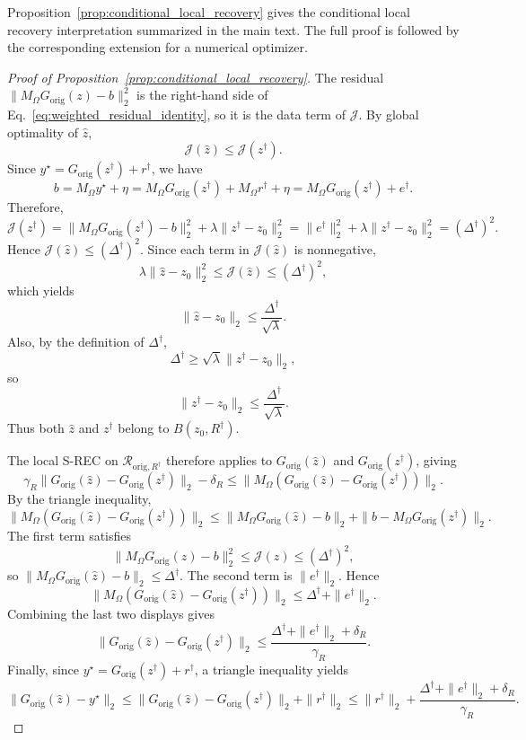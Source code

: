 Proposition~\ref{prop:conditional_local_recovery} gives the conditional local
recovery interpretation summarized in the main text. The full proof is followed
by the corresponding extension for a numerical optimizer.

\begin{proof}[Proof of Proposition~\ref{prop:conditional_local_recovery}]
The residual \(\|M_\Omega G_{\mathrm{orig}}(z)-b\|_2^2\) is the right-hand
side of Eq.~\eqref{eq:weighted_residual_identity}, so it is the data term
of \(\mathcal{J}\).
By global optimality of \(\hat z\),
\[
  \mathcal{J}(\hat z)\le \mathcal{J}(z^\dagger).
\]
Since \(y^\star = G_{\mathrm{orig}}(z^\dagger)+r^\dagger\), we have
\[
  b
  =
  M_\Omega y^\star+\eta
  =
  M_\Omega G_{\mathrm{orig}}(z^\dagger)+M_\Omega r^\dagger+\eta
  =
  M_\Omega G_{\mathrm{orig}}(z^\dagger)+e^\dagger.
\]
Therefore,
\[
  \mathcal{J}(z^\dagger)
  =
  \|M_\Omega G_{\mathrm{orig}}(z^\dagger)-b\|_2^2
  +
  \lambda\|z^\dagger-z_0\|_2^2
  =
  \|e^\dagger\|_2^2
  +
  \lambda\|z^\dagger-z_0\|_2^2
  =
  (\Delta^\dagger)^2.
\]
Hence \(\mathcal{J}(\hat z)\le (\Delta^\dagger)^2\). Since each term in
\(\mathcal{J}(\hat z)\) is nonnegative,
\[
  \lambda\|\hat z-z_0\|_2^2
  \le
  \mathcal{J}(\hat z)
  \le
  (\Delta^\dagger)^2,
\]
which yields
\[
  \|\hat z-z_0\|_2\le \frac{\Delta^\dagger}{\sqrt{\lambda}}.
\]
Also, by the definition of \(\Delta^\dagger\),
\[
  \Delta^\dagger\ge \sqrt{\lambda}\|z^\dagger-z_0\|_2,
\]
so
\[
  \|z^\dagger-z_0\|_2\le \frac{\Delta^\dagger}{\sqrt{\lambda}}.
\]
Thus both \(\hat z\) and \(z^\dagger\) belong to \(B(z_0,R^\dagger)\).

The local S-REC on \(\mathcal{R}_{\mathrm{orig},R^\dagger}\) therefore applies to
\(G_{\mathrm{orig}}(\hat z)\) and \(G_{\mathrm{orig}}(z^\dagger)\), giving
\[
  \gamma_R\|G_{\mathrm{orig}}(\hat z)-G_{\mathrm{orig}}(z^\dagger)\|_2-\delta_R
  \le
  \|M_\Omega(G_{\mathrm{orig}}(\hat z)-G_{\mathrm{orig}}(z^\dagger))\|_2.
\]
By the triangle inequality,
\[
  \|M_\Omega(G_{\mathrm{orig}}(\hat z)-G_{\mathrm{orig}}(z^\dagger))\|_2
  \le
  \|M_\Omega G_{\mathrm{orig}}(\hat z)-b\|_2
  +
  \|b-M_\Omega G_{\mathrm{orig}}(z^\dagger)\|_2.
\]
The first term satisfies
\[
  \|M_\Omega G_{\mathrm{orig}}(\hat z)-b\|_2^2
  \le
  \mathcal{J}(\hat z)
  \le
  (\Delta^\dagger)^2,
\]
so \(\|M_\Omega G_{\mathrm{orig}}(\hat z)-b\|_2\le \Delta^\dagger\). The second term is
\(\|e^\dagger\|_2\). Hence
\[
  \|M_\Omega(G_{\mathrm{orig}}(\hat z)-G_{\mathrm{orig}}(z^\dagger))\|_2
  \le
  \Delta^\dagger+\|e^\dagger\|_2.
\]
Combining the last two displays gives
\[
  \|G_{\mathrm{orig}}(\hat z)-G_{\mathrm{orig}}(z^\dagger)\|_2
  \le
  \frac{\Delta^\dagger+\|e^\dagger\|_2+\delta_R}{\gamma_R}.
\]
Finally, since \(y^\star=G_{\mathrm{orig}}(z^\dagger)+r^\dagger\), a triangle inequality yields
\[
  \|G_{\mathrm{orig}}(\hat z)-y^\star\|_2
  \le
  \|G_{\mathrm{orig}}(\hat z)-G_{\mathrm{orig}}(z^\dagger)\|_2
  +
  \|r^\dagger\|_2
  \le
  \|r^\dagger\|_2
  +
  \frac{\Delta^\dagger+\|e^\dagger\|_2+\delta_R}{\gamma_R}.
\]
\end{proof}

